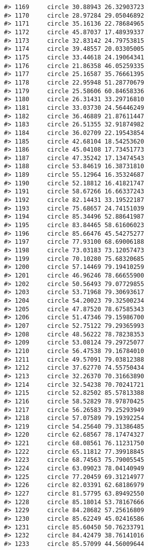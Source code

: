\documentclass[
]{book}
\theoremstyle{definition}
\theoremstyle{definition}
\theoremstyle{definition}
\theoremstyle{definition}
\theoremstyle{remark}
\begin{document}
\begin{verbatim}
#> 1169     circle 30.88943 26.32903723
#> 1170     circle 28.97284 29.05046892
#> 1171     circle 35.16136 22.78684965
#> 1172     circle 45.87037 17.48939337
#> 1173     circle 32.83142 24.79753815
#> 1174     circle 39.48557 20.03305005
#> 1175     circle 33.44618 24.19064341
#> 1176     circle 21.86358 46.05259335
#> 1177     circle 25.16587 35.76661395
#> 1178     circle 22.95948 51.28770679
#> 1179     circle 25.58606 60.84658336
#> 1180     circle 26.31431 33.29716810
#> 1181     circle 33.03730 24.56446249
#> 1182     circle 36.46889 21.87611447
#> 1183     circle 26.51355 32.91874982
#> 1184     circle 36.02709 22.19543854
#> 1185     circle 42.68104 18.54253620
#> 1186     circle 45.04108 17.73451773
#> 1187     circle 47.35242 17.13474543
#> 1188     circle 53.84619 16.38731810
#> 1189     circle 55.12964 16.35324687
#> 1190     circle 52.18812 16.41821747
#> 1191     circle 58.67266 16.66337243
#> 1192     circle 82.14431 33.19522187
#> 1193     circle 75.68657 24.74151039
#> 1194     circle 85.34496 52.88641987
#> 1195     circle 83.84465 58.61606023
#> 1196     circle 85.66476 45.54275277
#> 1197     circle 77.93100 68.69006188
#> 1198     circle 73.03183 73.12057473
#> 1199     circle 70.10280 75.68320685
#> 1200     circle 57.14469 79.19410259
#> 1201     circle 46.96246 78.66655900
#> 1202     circle 50.56493 79.07729855
#> 1203     circle 53.71968 79.30693617
#> 1204     circle 54.20023 79.32500234
#> 1205     circle 47.87520 78.67585343
#> 1206     circle 51.47346 79.15986700
#> 1207     circle 52.75122 79.29365993
#> 1208     circle 48.56222 78.78238353
#> 1209     circle 53.08124 79.29725077
#> 1210     circle 56.47538 79.16784010
#> 1211     circle 49.57091 79.03812388
#> 1212     circle 37.62770 74.55750434
#> 1213     circle 32.26370 70.31663890
#> 1214     circle 32.54238 70.70241721
#> 1215     circle 52.82502 85.57813388
#> 1216     circle 58.52829 78.97870425
#> 1217     circle 56.26583 79.25293949
#> 1218     circle 57.07589 79.19392254
#> 1219     circle 54.25640 79.31386485
#> 1220     circle 62.68567 78.17474327
#> 1221     circle 68.08561 76.11231750
#> 1222     circle 65.11812 77.39918845
#> 1223     circle 68.74563 75.79005545
#> 1224     circle 63.09023 78.04140949
#> 1225     circle 77.20459 69.31214977
#> 1226     circle 82.03391 62.68186979
#> 1227     circle 81.57795 63.89492550
#> 1228     circle 85.18014 53.78167666
#> 1229     circle 84.28682 57.25616809
#> 1230     circle 85.62249 45.02416586
#> 1231     circle 85.60450 50.76233791
#> 1232     circle 84.42479 38.76141016
#> 1233     circle 85.57099 44.56009644

\end{verbatim}
\end{document}
